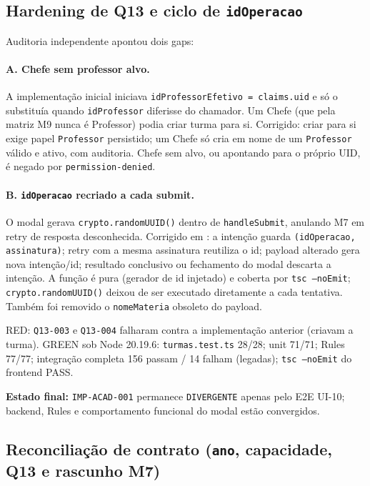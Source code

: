 \subsection{Hardening de Q13 e ciclo de \texttt{idOperacao}}

Auditoria independente apontou dois gaps:

\paragraph{A. Chefe sem professor alvo.} A implementação inicial iniciava
\texttt{idProfessorEfetivo = claims.uid} e só o substituía quando
\texttt{idProfessor} diferisse do chamador. Um Chefe (que pela matriz M9 nunca é
Professor) podia criar turma para si. Corrigido: criar para si exige papel
\texttt{Professor} persistido; um Chefe só cria em nome de um \texttt{Professor}
válido e ativo, com auditoria. Chefe sem alvo, ou apontando para o próprio UID,
é negado por \texttt{permission-denied}.

\paragraph{B. \texttt{idOperacao} recriado a cada submit.} O modal gerava
\texttt{crypto.randomUUID()} dentro de \texttt{handleSubmit}, anulando M7 em
retry de resposta desconhecida. Corrigido em
: a intenção guarda
\texttt{(idOperacao, assinatura)}; retry com a mesma assinatura reutiliza o id;
payload alterado gera nova intenção/id; resultado conclusivo ou fechamento do
modal descarta a intenção. A função é pura (gerador de id injetado) e coberta
por \texttt{tsc --noEmit}; \texttt{crypto.randomUUID()} deixou de ser executado
diretamente a cada tentativa. Também foi removido o \texttt{nomeMateria}
obsoleto do payload.

RED: \texttt{Q13-003} e \texttt{Q13-004} falharam contra a implementação
anterior (criavam a turma). GREEN sob Node 20.19.6: \texttt{turmas.test.ts}
28/28; unit 71/71; Rules 77/77; integração completa 156 passam / 14 falham
(legadas); \texttt{tsc --noEmit} do frontend PASS.

\textbf{Estado final:} \texttt{IMP-ACAD-001} permanece \texttt{DIVERGENTE}
apenas pelo E2E UI-10; backend, Rules e comportamento funcional do modal estão
convergidos.

\subsection{Reconciliação de contrato (\texttt{ano}, capacidade, Q13 e rascunho M7)}

